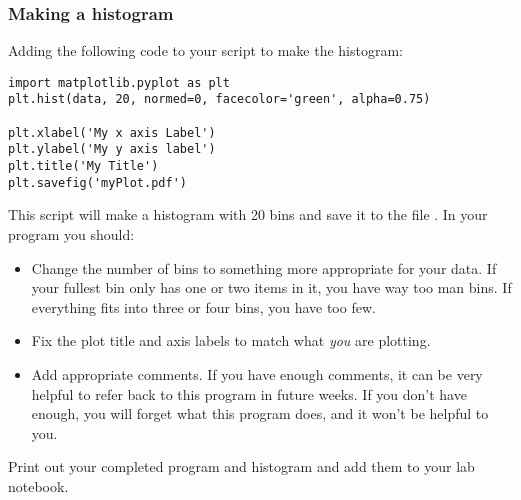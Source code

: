 \documentclass[twoside,11pt,ShortChapTitles]{BYUTextbook}
\begin{document}
\subsubsection{Making a histogram}

Adding the following code to your script to make the histogram:

\begin{Verbatim}
import matplotlib.pyplot as plt
plt.hist(data, 20, normed=0, facecolor='green', alpha=0.75)

plt.xlabel('My x axis Label')
plt.ylabel('My y axis label')
plt.title('My Title')
plt.savefig('myPlot.pdf')

\end{Verbatim}

This script will make a histogram with 20 bins and save it to the file .  In your program you should:
\begin{itemize}
\item Change the number of bins to something more appropriate for your data. If your fullest bin only has one or two items in it, you have way too man bins.  If everything fits into three or four bins, you have too few.
\item Fix the plot title and axis labels to match what {\em you} are plotting.
\item Add appropriate comments. If you have enough comments, it can be very helpful to refer back to this program in future weeks.  If you don't have enough, you will forget what this program does, and it won't be helpful to you.
\end{itemize}

Print out your completed program and histogram and add them to your lab notebook.
\end{document}
